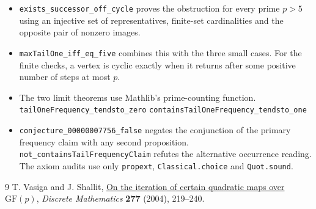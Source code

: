 \documentclass[11pt]{article}
\begin{document}
\begin{itemize}
\item \texttt{exists\_successor\_off\_cycle} proves the obstruction for
  every prime $p>5$ using an injective set of representatives,
  finite-set cardinalities and the opposite pair of nonzero images.
\item \texttt{maxTailOne\_iff\_eq\_five} combines this with the three
  small cases. For the finite checks, a vertex is cyclic exactly
  when it returns after some positive number of steps at most $p$.
\item The two limit theorems use Mathlib's prime-counting function.\newline
  \texttt{tailOneFrequency\_tendsto\_zero}\newline
  \texttt{containsTailOneFrequency\_tendsto\_one}
\item \texttt{conjecture\_00000007756\_false} negates the conjunction
  of the primary frequency claim with any second proposition.
  \texttt{not\_containsTailFrequencyClaim} refutes the alternative
  occurrence reading. The axiom audits use only \texttt{propext},
  \texttt{Classical.choice} and \texttt{Quot.sound}.
\end{itemize}

\begin{thebibliography}{9}
T. Vasiga and J. Shallit,
\href{https://cs.uwaterloo.ca/~shallit/Papers/vas.pdf}
     {On the iteration of certain quadratic maps over $\mathrm{GF}(p)$},
\emph{Discrete Mathematics} \textbf{277} (2004), 219--240.
\end{thebibliography}
\end{document}
